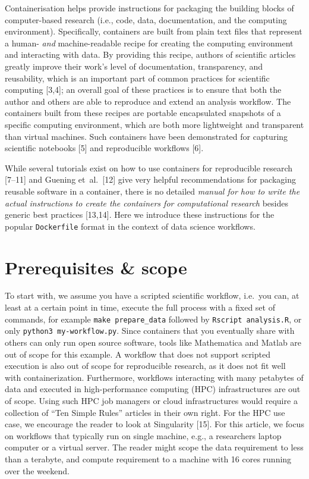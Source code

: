 \documentclass[10pt,letterpaper]{article}
\begin{document}
Containerisation helps provide instructions for packaging the building
blocks of computer-based research (i.e., code, data, documentation, and
the computing environment). Specifically, containers are built from
plain text files that represent a human- \emph{and} machine-readable
recipe for creating the computing environment and interacting with data.
By providing this recipe, authors of scientific articles greatly improve
their work's level of documentation, transparency, and reusability,
which is an important part of common practices for scientific computing
{[}3,4{]}; an overall goal of these practices is to ensure that both the
author and others are able to reproduce and extend an analysis workflow.
The containers built from these recipes are portable encapsulated
snapshots of a specific computing environment, which are both more
lightweight and transparent than virtual machines. Such containers have
been demonstrated for capturing scientific notebooks {[}5{]} and
reproducible workflows {[}6{]}.

While several tutorials exist on how to use containers for reproducible
research {[}7--11{]} and Guening et~al.~{[}12{]} give very helpful
recommendations for packaging reusable software in a container, there is
no detailed \emph{manual for how to write the actual instructions to
create the containers for computational research} besides generic best
practices {[}13,14{]}. Here we introduce these instructions for the
popular \texttt{Dockerfile} format in the context of data science
workflows.

\hypertarget{prerequisites-scope}{%
\section{Prerequisites \& scope}\label{prerequisites-scope}}

To start with, we assume you have a scripted scientific workflow,
i.e.~you can, at least at a certain point in time, execute the full
process with a fixed set of commands, for example
\texttt{make\ prepare\_data} followed by \texttt{Rscript\ analysis.R},
or only \texttt{python3\ my-workflow.py}. Since containers that you
eventually share with others can only run open source software, tools
like Mathematica and Matlab are out of scope for this example. A
workflow that does not support scripted execution is also out of scope
for reproducible research, as it does not fit well with
containerization. Furthermore, workflows interacting with many petabytes
of data and executed in high-performance computing (HPC) infrastructures
are out of scope. Using such HPC job managers or cloud infrastructures
would require a collection of ``Ten Simple Rules'' articles in their own
right. For the HPC use case, we encourage the reader to look at
Singularity {[}15{]}. For this article, we focus on workflows that
typically run on single machine, e.g., a researchers laptop computer or
a virtual server. The reader might scope the data requirement to less
than a terabyte, and compute requirement to a machine with 16 cores
running over the weekend.
\end{document}
